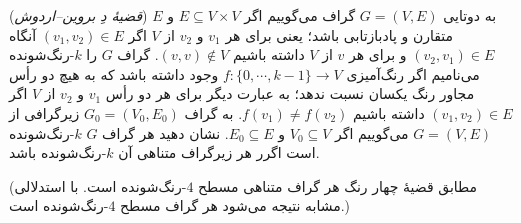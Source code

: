 (\emph{قضیهٔ دِ بروین--اردوش})
به دوتایی
$G=(V,E)$
گراف می‌گوییم اگر
$E\subseteq V\times V$
و
$E$
متقارن و پادبازتابی باشد؛ یعنی برای هر
$v_1$
و
$v_2$
از
$V$
اگر
$(v_1,v_2)\in E$
آنگاه
$(v_2,v_1)\in E$
و
برای هر
$v$
از
$V$
داشته باشیم
$(v,v)\not\in V$.
گراف
$G$
را
$k$-رنگ‌شونده
می‌نامیم اگر رنگ‌آمیزی
$f\colon\{0,\cdots,k-1\}\to V$
وجود داشته باشد که به هیچ دو رأس مجاور رنگ یکسان نسبت ندهد؛ به عبارت دیگر برای هر دو رأس
$v_1$
و
$v_2$
از
$V$
اگر
$(v_1,v_2)\in E$
داشته باشیم
$f(v_1)\neq f(v_2)$.
به گراف
$G_0=(V_0,E_0)$
زیرگرافی از
$G=(V,E)$
می‌گوییم
اگر
$V_0\subseteq V$
و
$E_0\subseteq E$.
نشان دهید هر گراف
$G$
$k$-رنگ‌شونده
است اگرر
هر زیرگراف متناهی آن
$k$-رنگ‌شونده
باشد.

(مطابق قضیهٔ چهار رنگ هر گراف متناهی مسطح
$4$-رنگ‌شونده
است. با استدلالی مشابه نتیجه می‌شود هر گراف مسطح  $4$-رنگ‌شونده
است.)